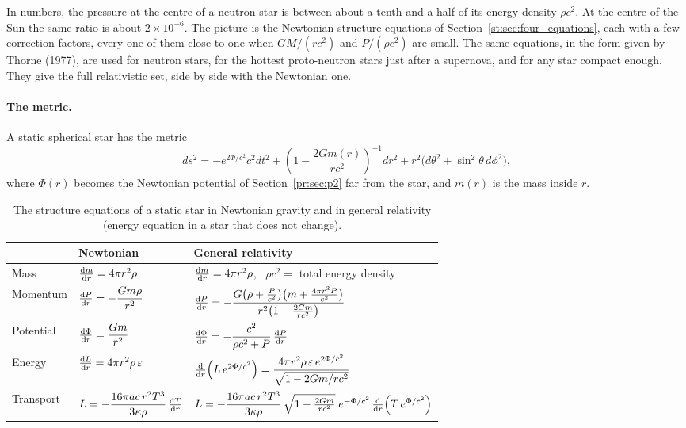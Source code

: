 In numbers, the pressure at the centre of a neutron star is between about a tenth and a half of its energy density $\rho c^2$. At the centre of the Sun the same ratio is about $2\times10^{-6}$. The picture is the Newtonian structure equations of Section~\ref{st:sec:four_equations}, each with a few correction factors, every one of them close to one when $GM/(rc^2)$ and $P/(\rho c^2)$ are small. The same equations, in the form given by Thorne (1977), are used for neutron stars, for the hottest proto-neutron stars just after a supernova, and for any star compact enough. They give the full relativistic set, side by side with the Newtonian one.

\paragraph{The metric.} A static spherical star has the metric
\begin{equation}
	ds^2=-e^{2\Phi/c^2}c^2dt^2+\left(1-\frac{2Gm(r)}{rc^2}\right)^{-1}dr^2+r^2\big(d\theta^2+\sin^2\theta\,d\phi^2\big),
\end{equation}
where $\Phi(r)$ becomes the Newtonian potential of Section~\ref{pr:sec:p2} far from the star, and $m(r)$ is the mass inside $r$.

\begin{table}[htbp]
	\centering
	\renewcommand{\arraystretch}{2.0}
	\begin{tabular}{@{}l l l@{}}
		\toprule
		& \textbf{Newtonian} & \textbf{General relativity} \\
		\midrule
		Mass & $\dv{m}{r}=4\pi r^2\rho$ & $\dv{m}{r}=4\pi r^2\rho$, \ $\rho c^2=$ total energy density \\
		Momentum & $\dv{P}{r}=-\dfrac{Gm\rho}{r^2}$ & $\dv{P}{r}=-\dfrac{G\big(\rho+\frac{P}{c^2}\big)\big(m+\frac{4\pi r^3P}{c^2}\big)}{r^2\big(1-\frac{2Gm}{rc^2}\big)}$ \\
		Potential & $\dv{\Phi}{r}=\dfrac{Gm}{r^2}$ & $\dv{\Phi}{r}=-\dfrac{c^2}{\rho c^2+P}\,\dv{P}{r}$ \\
		Energy & $\dv{L}{r}=4\pi r^2\rho\,\varepsilon$ & $\dv{r}\Big(L\,e^{2\Phi/c^2}\Big)=\dfrac{4\pi r^2\rho\,\varepsilon\,e^{2\Phi/c^2}}{\sqrt{1-2Gm/rc^2}}$ \\
		Transport & $L=-\dfrac{16\pi ac\,r^2T^3}{3\kappa\rho}\,\dv{T}{r}$ & $L=-\dfrac{16\pi ac\,r^2T^3}{3\kappa\rho}\,\sqrt{1-\tfrac{2Gm}{rc^2}}\;e^{-\Phi/c^2}\,\dv{r}\Big(T\,e^{\Phi/c^2}\Big)$ \\
		\bottomrule
	\end{tabular}
	\caption{The structure equations of a static star in Newtonian gravity and in general relativity (energy equation in a star that does not change).}
	\label{cs:tab:relativistic}
\end{table}

